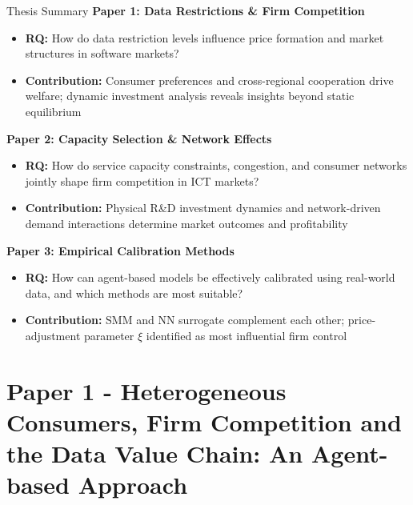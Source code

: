 \documentclass[10pt,aspectratio=169]{beamer}
\begin{document}
\begin{frame}{Thesis Summary}
\small
\textbf{Paper 1: Data Restrictions \& Firm Competition}
\begin{itemize}
    \item \textbf{RQ:} How do data restriction levels influence price formation and market structures in software markets?
    \item \textbf{Contribution:} Consumer preferences and cross-regional cooperation drive welfare; dynamic investment analysis reveals insights beyond static equilibrium
\end{itemize}

\vspace{2mm}
\textbf{Paper 2: Capacity Selection \& Network Effects}
\begin{itemize}
    \item \textbf{RQ:} How do service capacity constraints, congestion, and consumer networks jointly shape firm competition in ICT markets?
    \item \textbf{Contribution:} Physical R\&D investment dynamics and network-driven demand interactions determine market outcomes and profitability
\end{itemize}

\vspace{2mm}
\textbf{Paper 3: Empirical Calibration Methods}
\begin{itemize}
    \item \textbf{RQ:} How can agent-based models be effectively calibrated using real-world data, and which methods are most suitable?
    \item \textbf{Contribution:} SMM and NN surrogate complement each other; price-adjustment parameter $\xi$ identified as most influential firm control
\end{itemize}
\end{frame}

\section{Paper 1 - Heterogeneous Consumers, Firm Competition and the Data Value Chain: An Agent-based Approach}
\end{document}
